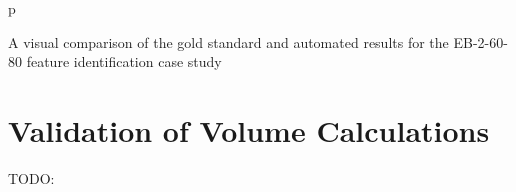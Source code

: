 \begin{stusubfig}{p}
	\hspace{4mm}%
\caption{A visual comparison of the gold standard and automated results for the EB-2-60-80 feature identification case study}
\label{fig:validation-EB-2-60-80}
\end{stusubfig}

\afterpage{\clearpage}
\newpage

\section{Validation of Volume Calculations}

TODO: \cite{woodard86}

